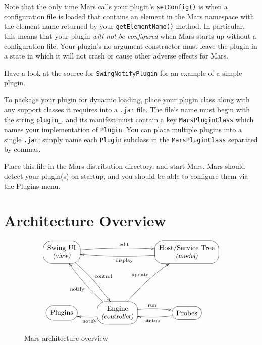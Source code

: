 \documentclass{article}
\makeatletter
\newcommand{\filename}[1]{{\tt #1}}
\newcommand{\identifier}[1]{{\tt #1}}
\newcommand{\guiitem}[1]{{\sf #1}}
\newcommand{\archc}[1]{*+<12pt>[F-:<12pt>]{\txt{#1}}}
\newcommand{\archto}[2]{\ar@/^/[#1]^{\txt{\scriptsize #2}}}
\makeatother
\begin{document}
Note that the only time Mars calls your plugin's \identifier{setConfig()} is
when a configuration file is loaded that contains an element in the Mars
namespace with the element name returned by your \identifier{getElementName()}
method. In particular, this means that your plugin {\em will not be configured}
when Mars starts up without a configuration file. Your plugin's no-argument
constructor must leave the plugin in a state in which it will not crash or
cause other adverse effects for Mars.

Have a look at the source for \identifier{SwingNotifyPlugin} for an example of
a simple plugin.

To package your plugin for dynamic loading, place your plugin class
along with any support classes it requires into a \filename{.jar}
file. The file's name must begin with the string
\filename{plugin\_}. and its manifest must contain a key
\identifier{MarsPluginClass} which names your implementation of
\identifier{Plugin}. You can place multiple plugins into a single
\filename{.jar}; simply name each \identifier{Plugin} subclass in the
\identifier{MarsPluginClass} separated by commas.

Place this file in the Mars distribution directory, and start
Mars. Mars should detect your plugin(s) on startup, and you should be
able to configure them via the \guiitem{Plugins} menu.

\section{Architecture Overview}
\label{sec_archdes}
\begin{center}
\begin{figure*}
\begin{displaymath}
\xymatrix{
    \archc{Swing UI\\{\small \sl (view)}}
        \archto{rr}{edit}
        \archto{rdd}{control} & & 
    \archc{Host/Service Tree\\{\small \sl (model)}}
        \archto{ll}{display} \\
    & & \\
    \archc{Plugins} &
    \archc{Engine\\{\small \sl (controller)}}
        \archto{l}{notify}
        \archto{luu}{notify}
        \archto{ruu}{update}
        \archto{r}{run} &
    \archc{Probes}
        \archto{l}{status} 
}
\end{displaymath}
\caption{Mars architecture overview}
\label{fig_arch}
\end{figure*}
\end{center}
\end{document}
